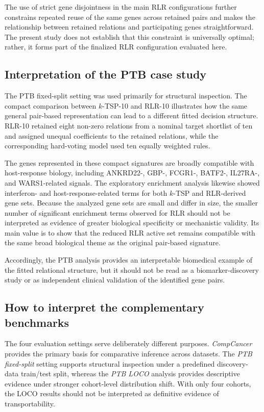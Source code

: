 \documentclass[journal]{IEEEtran}
\begin{document}
The use of strict gene disjointness in the main RLR configurations further constrains repeated reuse of the same genes across retained pairs and makes the relationship between retained relations and participating genes straightforward. The present study does not establish that this constraint is universally optimal; rather, it forms part of the finalized RLR configuration evaluated here.

\subsection{Interpretation of the PTB case study}

The PTB fixed-split setting was used primarily for structural inspection. The compact comparison between $k$-TSP-10 and RLR-10 illustrates how the same general pair-based representation can lead to a different fitted decision structure. RLR-10 retained eight non-zero relations from a nominal target shortlist of ten and assigned unequal coefficients to the retained relations, while the corresponding hard-voting model used ten equally weighted rules.

The genes represented in these compact signatures are broadly compatible with host-response biology, including ANKRD22-, GBP-, FCGR1-, BATF2-, IL27RA-, and WARS1-related signals. The exploratory enrichment analysis likewise showed interferon- and host-response-related terms for both $k$-TSP and RLR-derived gene sets. Because the analyzed gene sets are small and differ in size, the smaller number of significant enrichment terms observed for RLR should not be interpreted as evidence of greater biological specificity or mechanistic validity. Its main value is to show that the reduced RLR active set remains compatible with the same broad biological theme as the original pair-based signature.

Accordingly, the PTB analysis provides an interpretable biomedical example of the fitted relational structure, but it should not be read as a biomarker-discovery study or as independent clinical validation of the identified gene pairs.

\subsection{How to interpret the complementary benchmarks}

The four evaluation settings serve deliberately different purposes. \emph{CompCancer} provides the primary basis for comparative inference across datasets. The \emph{PTB fixed-split} setting supports structural inspection under a predefined discovery-data train/test split, whereas the \emph{PTB LOCO} analysis provides descriptive evidence under stronger cohort-level distribution shift. With only four cohorts, the LOCO results should not be interpreted as definitive evidence of transportability.
\end{document}
